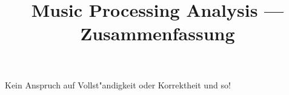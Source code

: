 \documentclass[fleqn,12pt]{scrartcl}
\title{Music Processing Analysis --- Zusammenfassung}
\begin{document}
\maketitle
\begin{center}Kein Anspruch auf Vollst"andigkeit oder Korrektheit und so!\end{center}

	\tableofcontents





\end{document}
